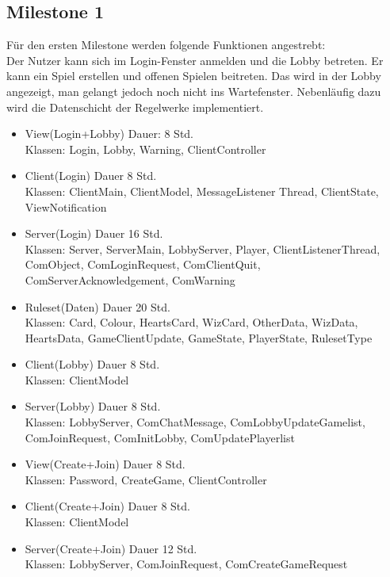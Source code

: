 \documentclass[twoside]{article}
\begin{document}
\subsection{Milestone 1}
Für den ersten Milestone werden folgende Funktionen angestrebt:\\
Der Nutzer kann sich im Login-Fenster anmelden und die Lobby betreten. Er kann ein Spiel erstellen und offenen Spielen beitreten. Das wird in der Lobby angezeigt, man gelangt jedoch noch nicht ins Wartefenster. Nebenläufig dazu wird die Datenschicht der Regelwerke implementiert.\\ 
\begin{itemize}
\item View(Login+Lobby) Dauer: 8 Std. \\
Klassen: Login, Lobby, Warning, ClientController
\item Client(Login) Dauer 8 Std. \\
Klassen: ClientMain, ClientModel, MessageListener Thread, ClientState, ViewNotification
\item Server(Login) Dauer 16 Std. \\
Klassen: Server, ServerMain, LobbyServer, Player, ClientListenerThread, ComObject, ComLoginRequest, ComClientQuit, ComServerAcknowledgement, ComWarning
\item Ruleset(Daten) Dauer 20 Std. \\
Klassen:  Card, Colour, HeartsCard, WizCard, OtherData, WizData, HeartsData, GameClientUpdate, GameState, PlayerState, RulesetType
\item Client(Lobby) Dauer 8 Std. \\
Klassen: ClientModel
\item Server(Lobby) Dauer 8 Std. \\
Klassen: LobbyServer, ComChatMessage, ComLobbyUpdateGamelist, ComJoinRequest, ComInitLobby, ComUpdatePlayerlist
\item View(Create+Join) Dauer 8 Std. \\
Klassen: Password, CreateGame, ClientController
\item Client(Create+Join) Dauer 8 Std. \\
Klassen: ClientModel
\item Server(Create+Join) Dauer 12 Std. \\
Klassen: LobbyServer, ComJoinRequest, ComCreateGameRequest
\end{itemize}
\end{document}
